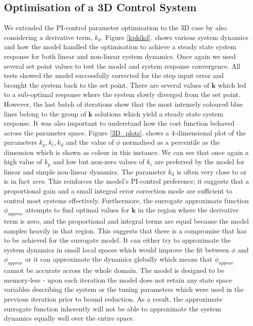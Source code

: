 \documentclass[conference]{IEEEtran}
\theoremstyle{definition}
\begin{document}
\subsection{Optimisation of a 3D Control System}
\noindent We extended the PI-control parameter optimisation to the 3D case by also considering a derivative term, $k_d$. Figure \ref{kpkikd}. shows various system dynamics and how the model handled the optimisation to achieve a steady state system response for both linear and non-linear system dynamics. Once again we used several set point values to test the model and system response convergence. All tests showed the model successfully corrected for the step input error and brought the system back to the set point. There are several values of $\mathbf{k}$ which led to a sub-optimal response where the system slowly diverged from the set point. However, the last batch of iterations show that the most intensely coloured blue lines belong to the group of $\mathbf{k}$ solutions which yield a steady state system response. It was also important to understand how the cost function behaved across the parameter space. Figure \ref{3D_plots}. shows a 4-dimensional plot of the parameters $k_p, k_i, k_d$ and the value of $\phi$ normalised as a percentile as the  dimension which is shown as colour in this instance. We can see that once again a high value of $k_p$ and low but non-zero values of $k_i$ are preferred by the model for linear and simple non-linear dynamics. The parameter $k_d$ is often very close to or is in fact \textit{zero}. This reinforces the model's PI-control preference; it suggests that a proportional gain and a small integral error correction mode are sufficient to control most systems effectively. Furthermore, the surrogate approximate function $\phi_{approx}$ attempts to find optimal values for $\mathbf{k}$ in the region where the derivative term is zero, and the proportional and integral terms are equal because the model samples heavily in that region. This suggests that there is a compromise that has to be achieved for the surrogate model. It can either try to approximate the system dynamics in small local spaces which would improve the fit between $\phi$ and $\phi_{approx}$ or it can approximate the dynamics globally which means that $\phi_{approx}$ cannot be accurate across the whole domain. The model is designed to be memory-less - upon each iteration the model does not retain any state space variables describing the system or the tuning parameters which were used in the previous iteration prior to bound reduction. As a result, the approximate surrogate function inherently will not be able to approximate the system dynamics equally well over the entire space. 
\end{document}

